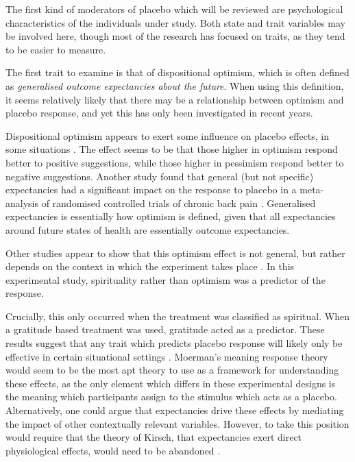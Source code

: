 The first kind of moderators of placebo which will be reviewed are psychological characteristics of the individuals under study. Both state and trait variables may be involved here, though most of the research has focused on traits, as they tend to be easier to measure. 

The first trait to examine is that of dispositional optimism, which is often defined as \textit{generalised outcome expectancies about the future}. When using this definition, it seems relatively likely that there may be a relationship between optimism and placebo response, and yet this has only been investigated in recent years. 

Dispositional optimism appears to exert some influence on placebo effects, in some situations \cite{Geers2005,morton2009reproducibility}. The effect seems to be that those higher in optimism respond better to positive suggestions, while those higher in pessimism respond better to negative suggestions. Another study found that general (but not specific) expectancies had a significant impact on the response to placebo in a meta-analysis of randomised controlled trials of chronic back pain \cite{myers2008patient}. Generalised expectancies is essentially how optimism is defined, given that all expectancies around future states of health are essentially outcome expectancies. 

Other studies appear to  show that this optimism effect is not general, but rather depends on the context in which the experiment takes place \cite{Hyland2006}. In this experimental study, spirituality rather than optimism was a predictor of the response.  

Crucially, this only occurred when the treatment was classified as spiritual. When a gratitude based treatment was used, gratitude acted as a predictor. These results suggest that any trait which predicts placebo response will likely only be effective in certain situational settings \cite{Kaptchuk2008a}. Moerman's meaning response theory would seem to be the most apt theory to use as a framework for understanding these effects, as the only element which differs in these experimental designs is the meaning which participants assign to the stimulus which acts as a placebo. Alternatively, one could argue that expectancies drive these effects by mediating the impact of other contextually relevant variables. However, to take this position would require that the theory of Kirsch, that expectancies exert direct physiological effects, would need to be abandoned \cite{Kirsch1985}.  

